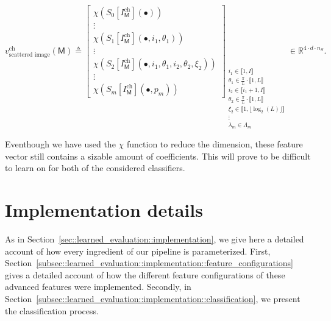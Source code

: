 \begin{description}
\begin{equation}
                            v^{\text{ch}}_{\text{scattered image}}\left(\mathsf{M}\right) \triangleq \begin{bmatrix}
                                \chi \left(S_0[I^{\text{ch}}_{\mathsf{M}}]\left(\bullet\right)\right)\\
                                \vdots\\
                                \chi \left(S_1[I^{\text{ch}}_{\mathsf{M}}]\left(\bullet, i_1, \theta_1\right)\right)\\
                                \vdots\\
                                \chi \left(S_2[I^{\text{ch}}_{\mathsf{M}}]\left(\bullet, i_1, \theta_1, i_2, \theta_2, \xi_2\right)\right)\\
                                \vdots\\
                                \chi \left(S_m[I^{\text{ch}}_{\mathsf{M}}]\left(\bullet, p_m\right)\right)
                            \end{bmatrix}_{
                                \substack{
                                    i_1 \in \llbracket 1, I \rrbracket\\
                                    \theta_1 \in \frac{\pi}{L} \cdot \llbracket 1, L \rrbracket\\
                                    i_2 \in \llbracket i_1 + 1, I \rrbracket\\
                                    \theta_2 \in \frac{\pi}{L} \cdot \llbracket 1, L \rrbracket\\
                                    \xi_2 \in \llbracket 1, \lfloor\log_2(L)\rfloor \rrbracket\\
                                    \vdots\\
                                    \lambda_m \in \Lambda_m
                                }
                            } \in \mathbb{R}^{4 \cdot d \cdot n_S}.
                        \end{equation}
            \end{description}
        
            Eventhough we have used the \(\chi\) function to reduce the dimension, these feature vector still contains a sizable amount of coefficients.
            This will prove to be difficult to learn on for both of the considered classifiers.

\section{Implementation details}
    \label{sec::better_representation::implementation}
    As in Section~\ref{sec::learned_evaluation::implementation}, we give here a detailed account of how every ingredient of our pipeline is parameterized.
    First, Section~\ref{subsec::learned_evaluation::implementation::feature_configurations} gives a detailed account of how the different feature configurations of these advanced features were implemented.
    Secondly, in Section~\ref{subsec::learned_evaluation::implementation::classification}, we present the classification process.

